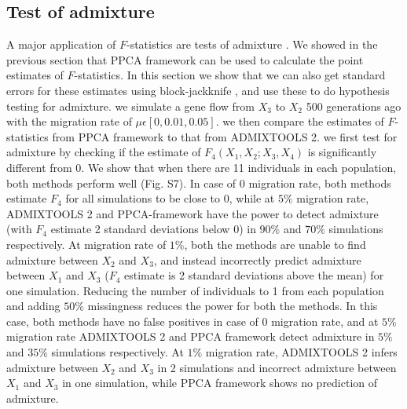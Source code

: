 \documentclass[12pt]{article}
\begin{document}
\subsection{Test of admixture}
A major application of $F$-statistics are tests of admixture \citep{orlando_ancient_2021}. We showed in the previous section that PPCA framework can be used to calculate the point estimates of $F$-statistics. In this section we show that we can also get standard errors for these estimates using block-jackknife \citep{kunsch_jackknife_1989,maier_limits_2022, patterson_modication_2020}, and use these to do hypothesis testing for admixture. we simulate a gene flow from $X_3$ to $X_2$ 500 generations ago with the migration rate of $\mu \epsilon [0, 0.01, 0.05]$. we then compare the estimates of $F$-statistics from PPCA framework to that from ADMIXTOOLS 2. we first test for admixture by checking if the estimate of $F_4(X_1,X_2;X_3,X_4)$ is significantly different from 0. We show that when there are 11 individuals in each population, both methods perform well (Fig. S7). In case of 0 migration rate, both methods estimate $F_4$ for all simulations to be close to 0, while at $5\%$ migration rate, ADMIXTOOLS 2 and PPCA-framework have the power to detect admixture (with $F_4$ estimate 2 standard deviations below 0) in $90\%$ and $70\%$ simulations respectively. At migration rate of $1\%$, both the methods are unable to find admixture between $X_2$ and $X_3$, and instead incorrectly predict admixture between $X_1$ and $X_3$ ($F_4$ estimate is 2 standard deviations above the mean) for one simulation. Reducing the number of individuals to 1 from each population and adding $50\%$ missingness reduces the power for both the methods. In this case, both methods have no false positives in case of 0 migration rate, and at $5\%$ migration rate ADMIXTOOLS 2 and PPCA framework detect admixture in $5\%$ and $35\%$ simulations respectively. At $1\%$ migration rate, ADMIXTOOLS 2 infers admixture between $X_2$ and $X_3$ in 2 simulations and incorrect admixture between $X_1$ and $X_3$ in one simulation, while PPCA framework shows no prediction of admixture.
\end{document}
